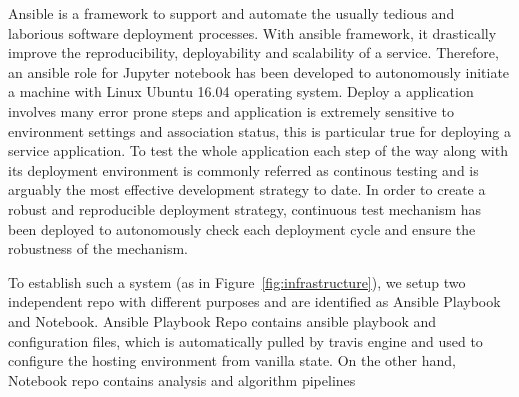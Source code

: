 Ansible is a framework to support and automate the usually tedious and laborious software deployment processes. With ansible framework, it drastically improve the reproducibility, deployability and scalability of a service. Therefore, 
an ansible role for Jupyter notebook has been developed to autonomously initiate a machine with Linux Ubuntu 16.04 operating system. 
Deploy a application involves many error prone steps and application is extremely sensitive to environment settings and association status, this is particular true for deploying a service application. To test the whole application each step of the way along with its deployment environment is commonly referred as continous testing and is arguably the most effective development strategy to date. In order to create a robust and reproducible deployment strategy, continuous test mechanism has been deployed to autonomously check each deployment cycle and ensure the robustness of the mechanism. 

To establish such a system (as in Figure~\ref{fig:infrastructure}), we setup two independent repo with different purposes and are identified as Ansible Playbook and Notebook.  Ansible Playbook Repo contains ansible\textsuperscript{\textcopyright} playbook and configuration files, which is automatically pulled by travis engine and used to configure the hosting environment from vanilla state. On the other hand, Notebook repo contains analysis and algorithm pipelines 